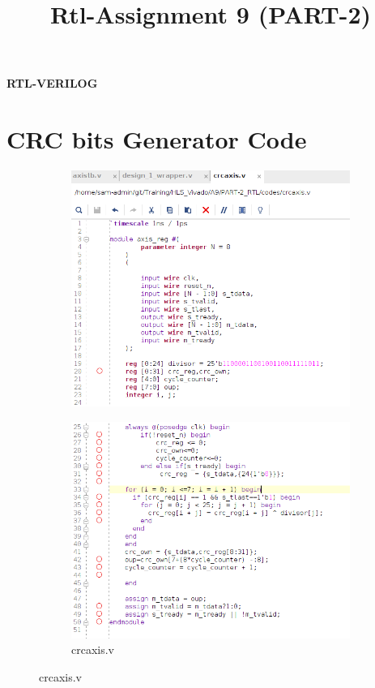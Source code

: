 \documentclass{article}
\title{
Rtl-Assignment 9 (PART-2)
}
\begin{document}
\maketitle
\hfill \textbf{RTL-VERILOG}

\section{CRC bits Generator Code}
\begin{figure}[h]
\centering
\begin{subfigure}[b]{0.6\textwidth}
    \centering
\includegraphics[width=\textwidth]{figs/p2src1.png}
    \label{fig:my_label}
\end{subfigure}
\hfill
\begin{subfigure}[b]{0.6\textwidth}
    \centering
\includegraphics[width=\textwidth]{figs/p2src2.png}
    \caption{crcaxis.v}
    \label{fig:my_label}
\end{subfigure}
\end{figure}
\end{document}

